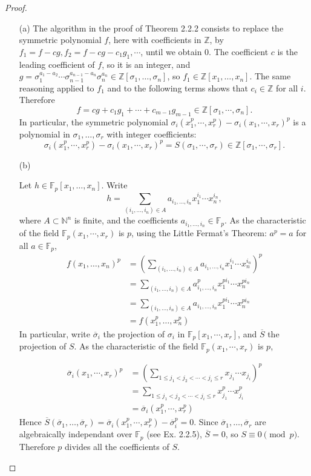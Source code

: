 \documentclass[11pt,a4paper]{article}
\newcommand{\Z}{\mathbb{Z}}
\newcommand{\N}{\mathbb{N}}
\newcommand{\F}{\mathbb{F}}
\begin{document}
\begin{proof}
\begin{enumerate}
\item[(a)]
The algorithm in the proof of Theorem 2.2.2 consists to replace the symmetric polynomial $f$, here with coefficients in $\Z$,  by $f_1 = f -c g, f_2 = f -c g -c_1g_1,\cdots$, until we obtain 0. The coefficient $c$ is the leading coefficient of $f$, so it is an integer, and $g= \sigma_1^{a_1-a_2}\cdots \sigma_{n-1}^{a_{n-1}-a_n}\sigma_n^{a_n} \in \Z[\sigma_1,\ldots,\sigma_n]$, so  $f_1 \in \Z[x_1,\ldots,x_n]$. The same reasoning applied to $f_1$ and to the following terms shows that $c_i \in \Z$ for all $i$. Therefore $$f  = cg+c_1g_1+\cdots+c_{m-1} g_{m-1}\in \Z[\sigma_1,\cdots,\sigma_n].$$
In particular, the symmetric polynomial $\sigma_i(x_1^p,\cdots,x_r^p) - \sigma_i(x_1,\cdots,x_r)^p$ is a polynomial in $\sigma_1,\ldots,\sigma_r$ with integer coefficients:
$$\sigma_i(x_1^p,\cdots,x_r^p) - \sigma_i(x_1,\cdots,x_r)^p = S(\sigma_1,\cdots,\sigma_r) \in \Z[\sigma_1,\cdots,\sigma_r].$$

\item[(b)]

Let $h \in \F_p[x_1,\ldots,x_n]$. Write $$h = \sum_{(i_1,\ldots,i_n) \in A} a_{i_1,\ldots,i_n} x_1^{i_1}\cdots x_n^{i_n},$$
where $A\subset \N^n$ is finite, and the coefficients $a_{i_1,\ldots,i_n} \in \F_p$.
As the characteristic of the field $\F_p(x_1,\cdots,x_r)$ is $p$, using the Little Fermat's Theorem: $a^p= a$ for all $a\in \F_p$,
\begin{align*}
f(x_1,\ldots,x_n)^p &= \left( \sum_{(i_1,\ldots,i_n) \in A} a_{i_1,\ldots,i_n} x_1^{i_1}\cdots x_n^{i_n} \right)^p\\
&=\sum_{(i_1,\ldots,i_n) \in A} a_{i_1,\ldots,i_n}^p x_1^{pi_1}\cdots x_n^{pi_n}\\
&=\sum_{(i_1,\ldots,i_n) \in A} a_{i_1,\ldots,i_n} x_1^{pi_1}\cdots x_n^{pi_n}\\
&=f(x_1^p,\ldots,x_n^p)
\end{align*}
In particular, write $\overline{\sigma}_i$ the projection of $\sigma_i$ in $\F_p[x_1,\cdots,x_r]$, and $\overline{S}$ the projection of $S$.
As the characteristic of the field $\F_p(x_1,\cdots,x_r)$ is $p$,

\begin{align*}
\overline{\sigma}_i(x_1,\cdots,x_r)^p &=  \left(\sum_{1\leq j_1 < j_2<\cdots<j_i\leq r} x_{j_1}\cdots x_{j_i}\right)^p\\
&=  \sum_{1\leq j_1 < j_2<\cdots<j_i\leq r} x_{j_1}^p\cdots x_{j_i}^p\\
&=\overline{\sigma}_i(x_1^p,\cdots,x_r^p)
\end{align*}
Hence $\overline{S}(\overline{\sigma}_1, \ldots, \overline{\sigma}_r) = \overline{\sigma}_i(x_1^p,\cdots,x_r^p) - \overline{\sigma}_i^p =  0$. Since $\overline{\sigma}_1, \ldots, \overline{\sigma}_r$ are algebraically independant over $\F_p$ (see Ex. 2.2.5),  $\overline{S} = 0$, so $S \equiv 0 \pmod p$.
Therefore $p$ divides all the coefficients of $S$.
\end{enumerate}
\end{proof}
\end{document}
